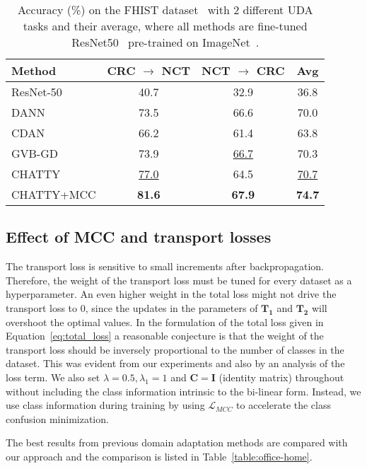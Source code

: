 \documentclass[10pt,twocolumn,letterpaper]{article}
\begin{document}
\begin{table}
\begin{center}
\begin{tabular}{|l|c|c|c|}
\hline
Method	&	CRC $\rightarrow$ NCT	&	NCT $\rightarrow$ CRC	&	Avg	\\
\hline
ResNet-50~\cite{resnet}	&	40.7	&	32.9	&	36.8	\\
DANN~\cite{dann}	&	73.5	&	66.6	&	70.0	\\
CDAN~\cite{cdan}	&	66.2	&	61.4	&	63.8	\\
GVB-GD~\cite{gvb}	&	73.9	&	 \underline{66.7} &	70.3	\\
\hline
CHATTY	&	\underline{77.0} & 64.5	&	\underline{70.7} \\
CHATTY+MCC	&	\textbf{81.6}	&	\textbf{67.9}	&	\textbf{74.7}	\\
\hline
\end{tabular}
\end{center}
\caption{Accuracy (\%) on the FHIST dataset~\cite{fhist} with 2 different UDA tasks and their average, where all methods are fine-tuned ResNet50~\cite{resnet} pre-trained on ImageNet~\cite{imagenet}.}
\label{table:fhist}
\end{table}


\subsection{Effect of MCC and transport losses}

The transport loss is sensitive to small increments after backpropagation. Therefore, the weight of the transport loss must be tuned for every dataset as a hyperparameter. An even higher weight in the total loss might not drive the transport loss to 0, since the updates in the parameters of $\mathbf{T_1}$ and $\mathbf{T_2}$ will overshoot the optimal values. 
In the formulation of the total loss given in Equation~\ref{eq:total_loss} a reasonable conjecture is that the weight of the transport loss should be inversely proportional to the number of classes in the dataset. This was evident from our experiments and also by an analysis of the loss term. We also set $\lambda = 0.5, \lambda_1 = 1$ and $ \mathbf{C} = \mathbf{I}$  (identity matrix) throughout without including the class information intrinsic to the bi-linear form. Instead, we use class information during training by using $\mathcal{L}_{MCC}$ to accelerate the class confusion minimization. 

The best results from previous domain adaptation methods are compared with our approach and the comparison is listed in Table~\ref{table:office-home}.
\end{document}
